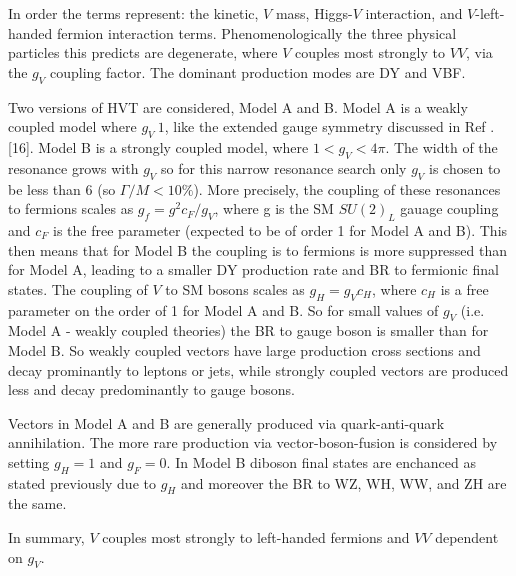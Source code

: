 In order the terms represent: the kinetic, $V$ mass, Higgs-$V$ interaction, and $V$-left-handed fermion interaction terms. Phenomenologically the three physical particles this predicts are degenerate, where $V$ couples most strongly to $VV$, via the $g_{V}$ coupling factor. The dominant production modes are DY and VBF. 

Two versions of HVT are considered, Model A and B. Model A is  a weakly coupled model where $g_{V} ~ 1$, like the extended gauge symmetry discussed in Ref . [16]. Model B is a strongly coupled model, where $1<g_{V}<4\pi$. The width of the resonance grows with $g_{V}$ so for this narrow resonance search only $g_{V}$ is chosen to be less than 6 (so $\Gamma / M < 10\%$). More precisely, the coupling of these resonances to fermions scales as $g_{f} = g^{2}c_{F}/g_{V}$, where g is the SM $SU(2)_{L}$ gauage coupling and $c_{F}$ is the free parameter (expected to be of order 1 for Model A and B). This then means that for Model B the coupling is to fermions is more suppressed than for Model A, leading to a smaller DY production rate and BR to fermionic final states. The coupling of $V$ to SM bosons scales as $g_{H}=g_{V}c_{H}$, where $c_{H}$ is a free parameter on the order of 1 for Model A and B. So for small values of $g_{V}$ (i.e. Model A - weakly coupled theories) the BR to gauge boson is smaller than for Model B. So weakly coupled vectors have large production cross sections and decay prominantly to leptons or jets, while strongly coupled vectors are produced less and decay predominantly to gauge bosons. 

Vectors in Model A and B are generally produced via quark-anti-quark annihilation. The more rare production via vector-boson-fusion is considered by setting $g_{H} = 1$ and $g_{F}=0$. In Model B diboson final states are enchanced as stated previously due to $g_{H}$ and moreover the BR to WZ, WH, WW, and ZH are the same.

In summary, $V$ couples most strongly to left-handed fermions and $VV$ dependent on $g_{V}$. 
